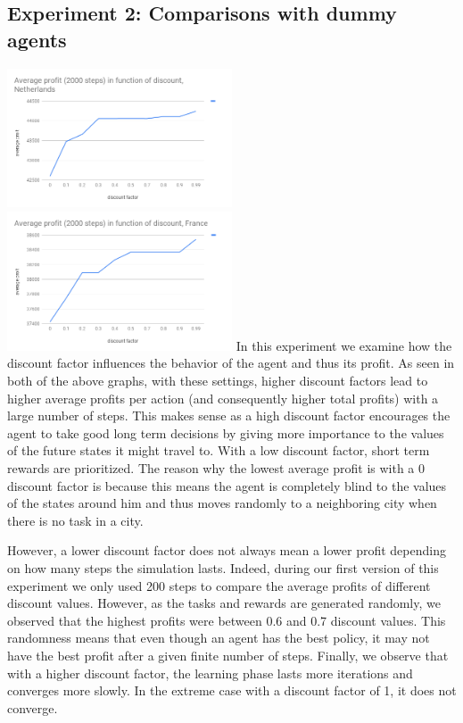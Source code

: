 \documentclass[11pt]{article}
\begin{document}
\subsection{Experiment 2: Comparisons with dummy agents}
 \includegraphics[width=0.5\textwidth]{netherlands.png}
 \includegraphics[width=0.5\textwidth]{france.png}
In this experiment we examine how the discount factor influences the behavior of the agent and thus its profit. As seen in both of the above graphs, with these settings, higher discount factors lead to higher average profits per action (and consequently higher total profits) with a large number of steps. This makes sense as a high discount factor encourages the agent to take good long term decisions by giving more importance to the values of the future states it might travel to. With a low discount factor, short term rewards are prioritized. The reason why the lowest average profit is with a 0 discount factor is because this means the agent is completely blind to the values of the states around him and thus moves randomly to a neighboring city when there is no task in a city. 

However, a lower discount factor does not always mean a lower profit depending on how many steps the simulation lasts. Indeed, during our first version of this experiment we only used 200 steps to compare the average profits of different discount values. However, as the tasks and rewards are generated randomly, we observed that the highest profits were between 0.6 and 0.7 discount values. This randomness means that even though an agent has the best policy, it may not have the best profit after a given finite number of steps.
Finally, we observe that with a higher discount factor, the learning phase lasts more iterations and converges more slowly. In the extreme case with a discount factor of 1, it does not converge.
\end{document}
